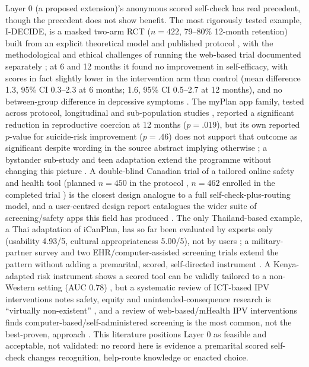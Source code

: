 Layer 0 (a proposed extension)'s anonymous scored self-check has real precedent, though the precedent does not show benefit. The most rigorously tested example, I-DECIDE, is a masked two-arm RCT ($n=422$, 79--80\% 12-month retention) built from an explicit theoretical model and published protocol \cite{ref119,ref121}, with the methodological and ethical challenges of running the web-based trial documented separately \cite{ref122}; at 6 and 12 months it found no improvement in self-efficacy, with scores in fact slightly lower in the intervention arm than control (mean difference 1.3, 95\% CI 0.3--2.3 at 6 months; 1.6, 95\% CI 0.5--2.7 at 12 months), and no between-group difference in depressive symptoms \cite{ref120}. The myPlan app family, tested across protocol, longitudinal and sub-population studies \cite{ref123,ref126,ref127,ref128}, reported a significant reduction in reproductive coercion at 12 months ($p=.019$), but its own reported $p$-value for suicide-risk improvement ($p=.46$) does not support that outcome as significant despite wording in the source abstract implying otherwise \cite{ref124}; a bystander sub-study and teen adaptation extend the programme without changing this picture \cite{ref125,ref126}. A double-blind Canadian trial of a tailored online safety and health tool (planned $n=450$ in the protocol \cite{ref129}, $n=462$ enrolled in the completed trial \cite{ref130}) is the closest design analogue to a full self-check-plus-routing model, and a user-centred design report catalogues the wider suite of screening/safety apps this field has produced \cite{ref131}. The only Thailand-based example, a Thai adaptation of iCanPlan, has so far been evaluated by experts only (usability 4.93/5, cultural appropriateness 5.00/5), not by users \cite{ref132}; a military-partner survey and two EHR/computer-assisted screening trials extend the pattern without adding a premarital, scored, self-directed instrument \cite{ref133,ref134,ref135}. A Kenya-adapted risk instrument shows a scored tool can be validly tailored to a non-Western setting (AUC 0.78) \cite{ref136}, but a systematic review of ICT-based IPV interventions notes safety, equity and unintended-consequence research is ``virtually non-existent'' \cite{ref137}, and a review of web-based/mHealth IPV interventions finds computer-based/self-administered screening is the most common, not the best-proven, approach \cite{ref138}. This literature positions Layer 0 as feasible and acceptable, not validated: no record here is evidence a premarital scored self-check changes recognition, help-route knowledge or enacted choice.

